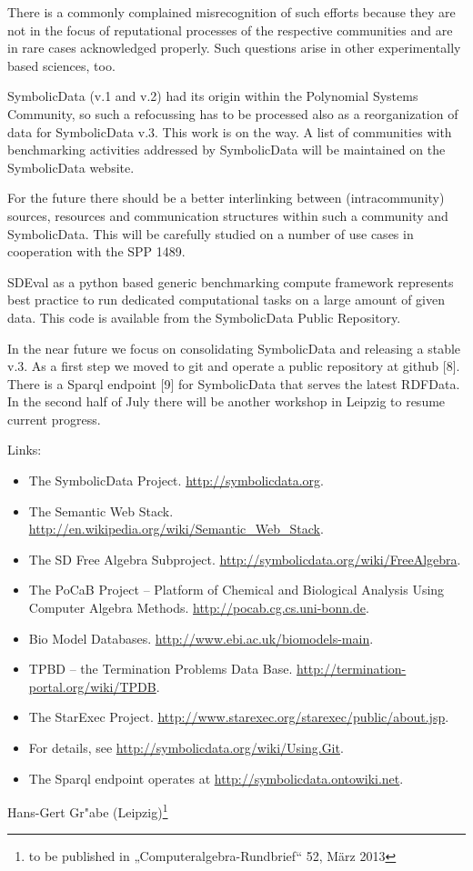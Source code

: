 \documentclass{article}
\begin{document}
There is a commonly complained misrecognition of such efforts because they are
not in the focus of reputational processes of the respective communities and
are in rare cases acknowledged properly.  Such questions arise in other
experimentally based sciences, too.

SymbolicData (v.1 and v.2) had its origin within the Polynomial Systems
Community, so such a refocussing has to be processed also as a reorganization
of data for SymbolicData v.3. This work is on the way. A list of communities
with benchmarking activities addressed by SymbolicData will be maintained on
the SymbolicData website.

For the future there should be a better interlinking between (intracommunity)
sources, resources and communication structures within such a community and
SymbolicData.  This will be carefully studied on a number of use cases in
cooperation with the SPP 1489.

SDEval as a python based generic benchmarking compute framework represents
best practice to run dedicated computational tasks on a large amount of given
data. This code is available from the SymbolicData Public Repository.

In the near future we focus on consolidating SymbolicData and releasing a
stable v.3. As a first step we moved to git and operate a public repository at
github [8]. There is a Sparql endpoint [9] for SymbolicData that serves the
latest RDFData.  In the second half of July there will be another workshop in
Leipzig to resume current progress.

Links:
\begin{itemize}
\item [{[1]}] The SymbolicData Project. \url{http://symbolicdata.org}.
\item [{[2]}] The Semantic Web Stack. 
  \url{http://en.wikipedia.org/wiki/Semantic_Web_Stack}.
\item [{[3]}] The SD Free Algebra Subproject. 
  \url{http://symbolicdata.org/wiki/FreeAlgebra}.
\item [{[4]}] The PoCaB Project -- Platform of Chemical and Biological
  Analysis Using Computer Algebra Methods.
  \url{http://pocab.cg.cs.uni-bonn.de}.
\item [{[5]}] Bio Model Databases. \url{http://www.ebi.ac.uk/biomodels-main}.
\item [{[6]}] TPBD -- the Termination Problems Data Base.
  \url{http://termination-portal.org/wiki/TPDB}.
\item [{[7]}] The StarExec Project.
  \url{http://www.starexec.org/starexec/public/about.jsp}. 
\item [{[8]}] For details, see \url{http://symbolicdata.org/wiki/Using.Git}.
\item [{[9]}] The Sparql endpoint operates at
  \url{http://symbolicdata.ontowiki.net}.
\end{itemize}
\begin{flushright}
    Hans-Gert Gr"abe (Leipzig)\footnote{to be published in
      „Computeralgebra-Rundbrief“ 52, März 2013}
  \end{flushright}
\end{document}
